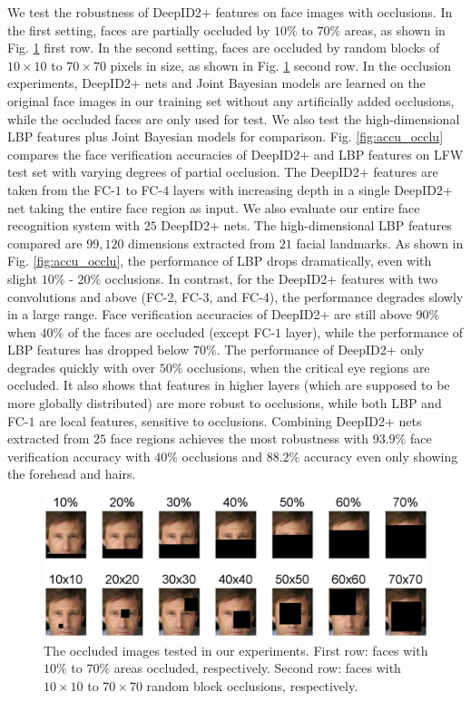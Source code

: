 \documentclass[10pt,twocolumn,letterpaper]{article}
\begin{document}
We test the robustness of DeepID2+ features on face images with occlusions. In the first setting, faces are partially occluded by $10\%$ to $70\%$ areas, as shown in Fig. \ref{fig:img_occlu} first row. In the second setting, faces are occluded by random blocks of $10\times10$ to $70\times70$ pixels in size, as shown in Fig. \ref{fig:img_occlu} second row. In the occlusion experiments, DeepID2+ nets and Joint Bayesian models are learned on the original face images in our training set without any artificially added occlusions, while the occluded faces are only used for test. We also test the high-dimensional LBP features plus Joint Bayesian models \cite{chen2013} for comparison. Fig. \ref{fig:accu_occlu} compares the face verification accuracies of DeepID2+ and LBP features on LFW test set with varying degrees of partial occlusion. The DeepID2+ features are taken from the FC-$1$ to FC-$4$ layers with increasing depth in a single DeepID2+ net taking the entire face region as input. We also evaluate our entire face recognition system with $25$ DeepID2+ nets. The high-dimensional LBP features compared are $99,120$ dimensions extracted from $21$ facial landmarks. As shown in Fig. \ref{fig:accu_occlu}, the performance of LBP  drops dramatically, even with slight $10\%$ - $20\%$ occlusions. In contrast, for the DeepID2+ features with two convolutions and above (FC-2, FC-3, and FC-4), the performance degrades slowly in a large range. Face verification accuracies of DeepID2+ are still above $90\%$ when $40\%$ of the faces are occluded (except FC-$1$ layer), while the performance of LBP features has dropped below $70\%$. The performance of DeepID2+ only degrades quickly with over $50\%$ occlusions, when the critical eye regions are occluded. It also shows that features in higher layers (which are supposed to be more globally distributed) are more robust to occlusions, while both LBP and FC-$1$ are local features, sensitive to occlusions. Combining DeepID2+ nets extracted from $25$ face regions achieves the most robustness with $93.9\%$ face verification accuracy with $40\%$ occlusions and $88.2\%$ accuracy even only showing the forehead and hairs.

\begin{figure}[t]
\begin{center}
\includegraphics[width=0.9\linewidth]{picture/15.png}
\end{center}
\vspace{-0.15in}
\caption{The occluded images tested in our experiments. First row: faces with $10\%$ to $70\%$ areas occluded, respectively. Second row: faces with $10\times10$ to $70\times70$ random block occlusions, respectively.}
\label{fig:img_occlu}
\vspace{-0.1in}
\end{figure}
\end{document}
